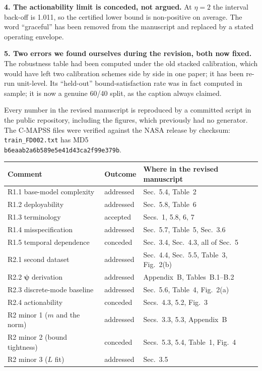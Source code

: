 \documentclass[11pt,a4paper]{article}
\begin{document}
\textbf{4. The actionability limit is conceded, not argued.} At $\eta=2$ the interval back-off is
1.011, so the certified lower bound is non-positive on average. The word ``graceful'' has been
removed from the manuscript and replaced by a stated operating envelope.

\textbf{5. Two errors we found ourselves during the revision, both now fixed.} The robustness table
had been computed under the old stacked calibration, which would have left two calibration schemes
side by side in one paper; it has been re-run unit-level. Its ``held-out'' bound-satisfaction rate
was in fact computed in sample; it is now a genuine 60/40 split, as the caption always claimed.

Every number in the revised manuscript is reproduced by a committed script in the public repository,
including the figures, which previously had no generator. The C-MAPSS files were verified against
the NASA release by checksum: \texttt{train\_FD002.txt} has MD5\\
\texttt{b6eaab2a6b589e5e41d43ca2f99e379b}.

\begin{center}
\small
\begin{tabular}{@{}llp{62mm}@{}}
\toprule
Comment & Outcome & Where in the revised manuscript \\
\midrule
R1.1 base-model complexity & addressed & Sec.~5.4, Table~2 \\
R1.2 deployability         & addressed & Sec.~5.8, Table~6 \\
R1.3 terminology           & accepted  & Secs.~1, 5.8, 6, 7 \\
R1.4 misspecification      & addressed & Sec.~5.7, Table~5, Sec.~3.6 \\
R1.5 temporal dependence   & conceded  & Sec.~3.4, Sec.~4.3, all of Sec.~5 \\
R2.1 second dataset        & addressed & Sec.~4.4, Sec.~5.5, Table~3, Fig.~2(b) \\
R2.2 $\boldsymbol\psi$ derivation & addressed & Appendix~B, Tables~B.1--B.2 \\
R2.3 discrete-mode baseline & addressed & Sec.~5.6, Table~4, Fig.~2(a) \\
R2.4 actionability         & conceded  & Secs.~4.3, 5.2, Fig.~3 \\
R2 minor 1 ($m$ and the norm) & addressed & Secs.~3.3, 5.3, Appendix~B \\
R2 minor 2 (bound tightness)  & conceded & Secs.~5.3, 5.4, Table~1, Fig.~4 \\
R2 minor 3 ($L$ fit)          & addressed & Sec.~3.5 \\
\bottomrule
\end{tabular}
\end{center}
\end{document}
